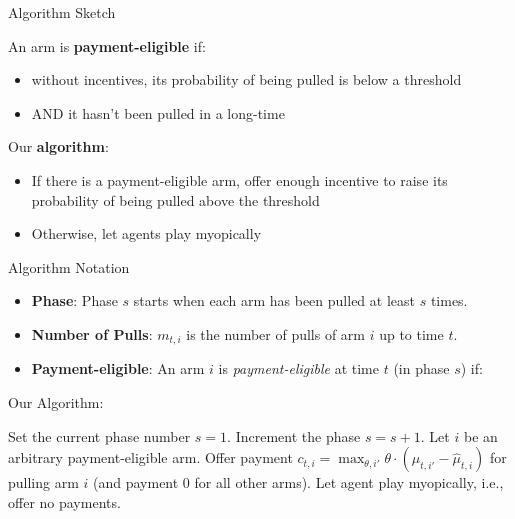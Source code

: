 \documentclass[serif]{beamer}
\begin{document}
\begin{frame}{Algorithm Sketch}

An arm is \textbf{payment-eligible} if:
\begin{itemize}[label=\textbullet]
\item without incentives, its probability of being pulled is below a threshold
\item AND it hasn't been pulled in a long-time
\end{itemize}
\vspace{0.5cm}

Our \textbf{algorithm}:
\begin{itemize}[label=\textbullet]
\item If there is a payment-eligible arm, offer enough incentive to raise its probability of being pulled above the threshold
\item Otherwise, let agents play myopically
\end{itemize}
\end{frame}



\begin{frame}{Algorithm Notation}
\begin{itemize}[label=\textbullet]
\item \textbf{Phase}: Phase $s$ starts when each arm has been pulled at least $s$ times. 
\item \textbf{Number of Pulls}: $m_{t,i}$ is the number of pulls of arm $i$ up to time $t$. 
\item \textbf{Payment-eligible}: An arm $i$ is \emph{payment-eligible} at time $t$ (in phase $s$) if:
\end{itemize}
\end{frame}


\begin{frame}{Our Algorithm:}

\begin{algorithmic}
\STATE Set the current phase number $s = 1$.
 {
\STATE Increment the phase $s = s + 1$.
\ENDIF
{} 
    \STATE Let $i$ be an arbitrary payment-eligible arm.
    \STATE Offer payment $c_{t,i} = \max_{\theta,i'} \theta \cdot (\hat{\mu}_{t,i'} - \hat{\mu}_{t,i})$ for pulling arm $i$ (and payment 0 for all other arms).
\ELSE
    \STATE Let agent play myopically, i.e., offer no payments.
\ENDIF 
}\ENDFOR
\end{algorithmic}

\end{frame}
	
\end{document}
